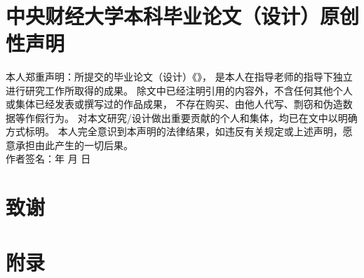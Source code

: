 \documentclass[a4paper,12pt]{report}
\begin{document}
\thispagestyle{plain}
\setcounter{page}{1}
\begin{spacing}{1.8333} %
\tableofcontents %
\end{spacing}
\newpage
\begin{center}
    \textbf{}
    \\[12pt]
\end{center}
\thispagestyle{plain}
\setcounter{page}{1}





\vspace{12pt}
\printbibliography
{}
\newpage
\chapter*{中央财经大学本科毕业论文（设计）原创性声明}
\vspace{1mm}
本人郑重声明：所提交的毕业论文（设计）《\MYTITLE》，
是本人在指导老师的指导下独立进行研究工作所取得的成果。
除文中已经注明引用的内容外，不含任何其他个人或集体已经发表或撰写过的作品成果，
不存在购买、由他人代写、剽窃和伪造数据等作假行为。
对本文研究/设计做出重要贡献的个人和集体，均已在文中以明确方式标明。
本人完全意识到本声明的法律结果，如违反有关规定或上述声明，愿意承担由此产生的一切后果。
\\[50pt]
作者签名：\hfill 年 \quad 月 \quad 日\\
\newpage
\chapter*{致谢}

\newpage
\chapter*{附录}

\end{document}
